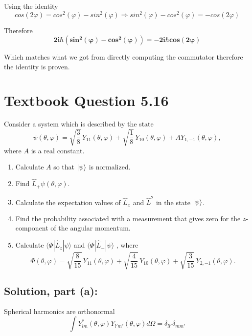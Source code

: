 \documentclass[12pt]{article}
\begin{document}
        Using the identity
        \[
            cos(2\varphi) = cos^2(\varphi) - sin^2(\varphi) \Rightarrow sin^2(\varphi) - cos^2(\varphi) = - cos(2\varphi)
        \]

        Therefore
        \[
            \boldsymbol{\boxed{2 i \hbar(sin^2(\varphi) - cos^2(\varphi)) = - 2 i \hbar cos(2 \varphi)}}
        \]

        Which matches what we got from directly computing the commutator therefore the identity is proven. 

\section{Textbook Question 5.16}
    Consider a system which is described by the state
    \[
        \psi(\theta, \varphi) = \sqrt{\frac{3}{8}}\, Y_{11}(\theta, \varphi)
        + \sqrt{\frac{1}{8}}\, Y_{10}(\theta, \varphi)
        + A Y_{1,-1}(\theta, \varphi),
    \]
    where \( A \) is a real constant.
    
    \begin{enumerate}
        \item[(a)] Calculate \( A \) so that \( \ket{\psi} \) is normalized. 
        \item[(b)] Find \( \hat{L}_+ \psi(\theta, \varphi) \). 
        \item[(c)] Calculate the expectation values of \( \hat{L}_x \) and \( \hat{L}^2 \) in the state \( \ket{\psi} \).
        \item[(d)] Find the probability associated with a measurement that gives zero for the \( z \)-component of the angular momentum.
        \item[(e)] Calculate 
        \( 
            \langle \Phi | \hat{L}_z | \psi \rangle 
        \) 
        and 
        \( 
            \langle \Phi | \hat{L}_- | \psi \rangle 
        \)
        , where
        \[
            \Phi(\theta, \varphi) =
            \sqrt{\frac{8}{15}}\, Y_{11}(\theta, \varphi)
            + \sqrt{\frac{4}{15}}\, Y_{10}(\theta, \varphi)
            + \sqrt{\frac{3}{15}}\, Y_{2,-1}(\theta, \varphi).
        \]
    \end{enumerate}


    \subsection{Solution, part (a):}
        Spherical harmonics are orthonormal
        \[
            \int Y_{lm}^*(\theta,\varphi) Y_{l'm'}(\theta, \varphi) d\Omega = \delta_{ll'} \delta_{mm'}
        \]
\end{document}
